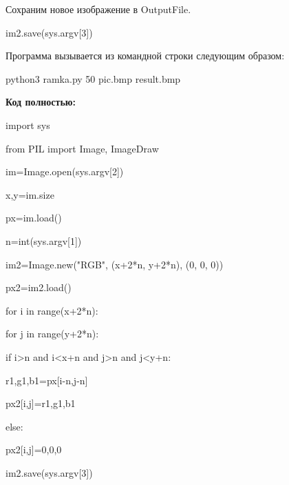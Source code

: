 \documentclass{article}
\newcommand\tab[1][1cm]{\hspace*{#1}}
\begin{document}
Сохраним новое изображение в OutputFile.

{
im2.save(sys.argv[3])}

Программа вызывается из командной строки следующим образом:

{
python3 ramka.py 50 pic.bmp result.bmp}

\newpage
{\large\bf Код полностью:}

{
import sys

from PIL import Image, ImageDraw

im=Image.open(sys.argv[2])

x,y=im.size

px=im.load()

n=int(sys.argv[1])

im2=Image.new("RGB", (x+2*n, y+2*n), (0, 0, 0))

px2=im2.load()

for i in range(x+2*n):

\tab[1cm]	for j in range(y+2*n):

\tab[2cm]		if i>n and i<x+n and j>n and j<y+n:

\tab[3cm]			r1,g1,b1=px[i-n,j-n]

\tab[3cm]			px2[i,j]=r1,g1,b1

\tab[2cm]		else:

\tab[3cm]			px2[i,j]=0,0,0

im2.save(sys.argv[3])
}
\end{document}

